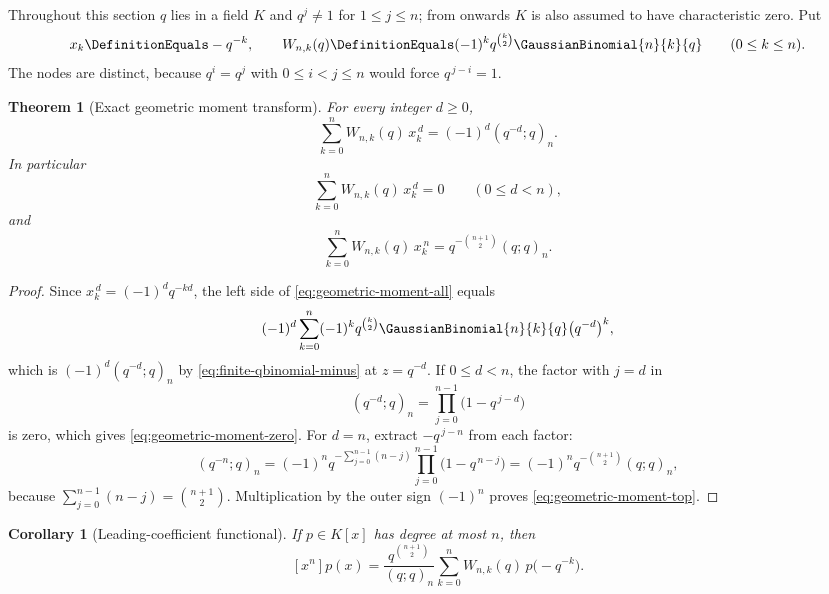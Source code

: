 \documentclass[11pt,a4paper,oneside,openany]{book}
\newtheorem{theorem}{Theorem}[chapter]
\newtheorem{corollary}[corollary]{Corollary}
\theoremstyle{definition}
\theoremstyle{remark}
\begin{document}
Throughout this section $q$ lies in a field $K$ and $q^j\ne1$ for $1\le j\le n$; from  onwards $K$ is also assumed to have characteristic zero.  Put
\begin{equation}\label{eq:reciprocal-nodes-weights}
 x_k\DefinitionEquals-q^{-k},
 \qquad
 W_{n,k}(q)\DefinitionEquals(-1)^kq^{\binom k2}\GaussianBinomial{n}{k}{q}
 \qquad(0\le k\le n).
\end{equation}
The nodes are distinct, because $q^i=q^j$ with $0\le i<j\le n$ would force $q^{\,j-i}=1$.

\begin{theorem}[Exact geometric moment transform]\label{thm:geometric-moment-transform}
For every integer $d\ge0$,
\begin{equation}\label{eq:geometric-moment-all}
 \sum_{k=0}^{n}W_{n,k}(q)\,x_k^{\,d}
 =(-1)^d(q^{-d};q)_n.
\end{equation}
In particular
\begin{equation}\label{eq:geometric-moment-zero}
 \sum_{k=0}^{n}W_{n,k}(q)\,x_k^{\,d}=0
 \qquad(0\le d<n),
\end{equation}
and
\begin{equation}\label{eq:geometric-moment-top}
 \sum_{k=0}^{n}W_{n,k}(q)\,x_k^{\,n}
 =q^{-\binom{n+1}{2}}(q;q)_n.
\end{equation}
\end{theorem}

\begin{proof}
Since $x_k^{\,d}=(-1)^dq^{-kd}$, the left side of \eqref{eq:geometric-moment-all} equals
\[
 (-1)^d\sum_{k=0}^{n}(-1)^kq^{\binom k2}\GaussianBinomial{n}{k}{q}\bigl(q^{-d}\bigr)^{k},
\]
which is $(-1)^d(q^{-d};q)_n$ by \eqref{eq:finite-qbinomial-minus} at $z=q^{-d}$.  If $0\le d<n$, the factor with $j=d$ in
\[
 (q^{-d};q)_n=\prod_{j=0}^{n-1}\bigl(1-q^{\,j-d}\bigr)
\]
is zero, which gives \eqref{eq:geometric-moment-zero}.  For $d=n$, extract $-q^{\,j-n}$ from each factor:
\[
 (q^{-n};q)_n
 =(-1)^nq^{-\sum_{j=0}^{n-1}(n-j)}\prod_{j=0}^{n-1}\bigl(1-q^{\,n-j}\bigr)
 =(-1)^nq^{-\binom{n+1}{2}}(q;q)_n,
\]
because $\sum_{j=0}^{n-1}(n-j)=\binom{n+1}{2}$.  Multiplication by the outer sign $(-1)^n$ proves \eqref{eq:geometric-moment-top}.
\end{proof}

\begin{corollary}[Leading-coefficient functional]\label{cor:reciprocal-leading-coefficient}
If $p\in K[x]$ has degree at most $n$, then
\begin{equation}\label{eq:reciprocal-leading-functional}
 [x^n]p(x)
 =\frac{q^{\binom{n+1}{2}}}{(q;q)_n}
  \sum_{k=0}^{n}W_{n,k}(q)\,p\bigl(-q^{-k}\bigr).
\end{equation}
\end{corollary}
\end{document}
